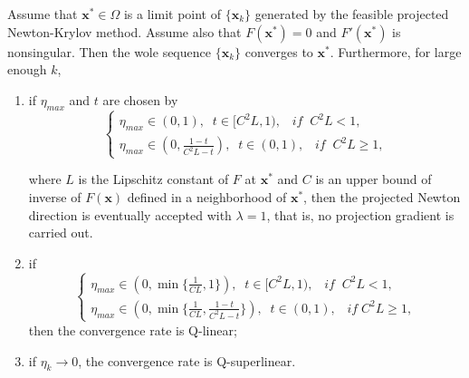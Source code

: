 \begin{theorem}
	Assume that $\textbf{x}^* \in \Omega$ is a limit point of $\{\textbf{x}_k\} $ generated by the feasible projected Newton-Krylov method. Assume also that $F(\textbf{x}^*) = 0 $ and $F'(\textbf{x}^*)$ is nonsingular. Then the wole sequence $ \{\textbf{x}_k\}  $ converges to $ \textbf{x}^* $. Furthermore, for large enough $ k $, 
	
	\begin{enumerate}[label=(\alph*)]
		\item if $ \eta_{max} $ and $ t $ are chosen by 
		\begin{equation*}
		\begin{cases}
		\eta_{max} \in (0,1),\; \; t \in [C^2L, 1), \; \; \; if  \; \;C^2L < 1,\\
		\eta_{max} \in (0,\frac{1-t}{C^2L-t}),\; \; t \in (0, 1), \; \; \; if  \;	 \;C^2L \geq 1 	,
		\end{cases}
		\end{equation*}
		
		where $ L $ is the Lipschitz constant of $ F $ at $ \textbf{x}^* $ and $ C $ is an upper bound of inverse of $ F(\textbf{x}) $ defined in a neighborhood of $ \textbf{x}^* $, then the projected Newton direction is eventually accepted with $ \lambda = 1$, that is, no projection gradient is carried out.
		\item if 
		\begin{equation*}
		\begin{cases}
		\eta_{max} \in (0,\min\{ \frac{1}{CL}, 1\}),\; \; t \in [C^2L, 1), \; \; \; if  \; \;C^2L < 1,\\
		\eta_{max} \in (0,\min\{ \frac{1}{CL}, \frac{1-t}{C^2 L - t}\}),\; \; t \in (0, 1), \; \; \; if   \;C^2L \geq 1 	,
		\end{cases}
		\end{equation*}
		then the convergence rate is Q-linear;
		\item if $ \eta_k \rightarrow 0 $, the convergence rate is Q-superlinear.
	\end{enumerate}
\end{theorem}
